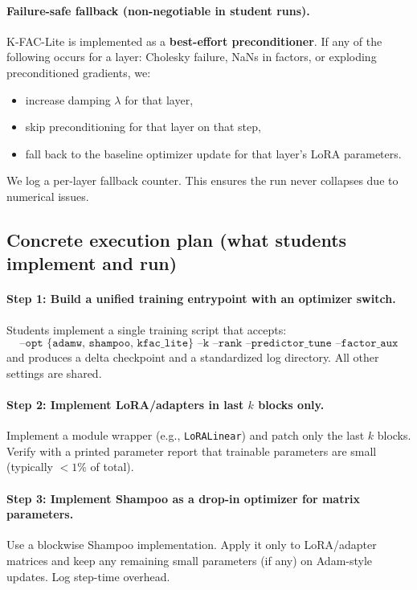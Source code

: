 \paragraph{Failure-safe fallback (non-negotiable in student runs).}
K-FAC-Lite is implemented as a \textbf{best-effort preconditioner}. If any of the following occurs for a layer: Cholesky failure, NaNs in factors, or exploding preconditioned gradients, we:
\begin{itemize}[leftmargin=*,itemsep=2pt]
\item increase damping $\lambda$ for that layer,
\item skip preconditioning for that layer on that step,
\item fall back to the baseline optimizer update for that layer’s LoRA parameters.
\end{itemize}
We log a per-layer fallback counter. This ensures the run never collapses due to numerical issues.

\subsection{Concrete execution plan (what students implement and run)}
\label{sec:concrete_execution_plan}

\paragraph{Step 1: Build a unified training entrypoint with an optimizer switch.}
Students implement a single training script that accepts:
\[
\texttt{--opt \{adamw, shampoo, kfac\_lite\} \ \ --k \ \ --rank \ \ --predictor\_tune \ \ --factor\_aux}
\]
and produces a delta checkpoint and a standardized log directory. All other settings are shared.

\paragraph{Step 2: Implement LoRA/adapters in last $k$ blocks only.}
Implement a module wrapper (e.g., \texttt{LoRALinear}) and patch only the last $k$ blocks. Verify with a printed parameter report that trainable parameters are small (typically $<1\%$ of total).

\paragraph{Step 3: Implement Shampoo as a drop-in optimizer for matrix parameters.}
Use a blockwise Shampoo implementation. Apply it only to LoRA/adapter matrices and keep any remaining small parameters (if any) on Adam-style updates. Log step-time overhead.

